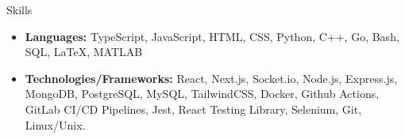\begin{cvsection}{Skills}
  \begin{cvsubsection}{}{}{}	
    \begin{itemize}
      \item \textbf{Languages:} TypeScript, JavaScript, HTML, CSS, Python, C++, Go, Bash, SQL, LaTeX, MATLAB
      \item \textbf{Technologies/Frameworks:} React, Next.js, Socket.io, Node.js, Express.js, MongoDB, PostgreSQL, MySQL, TailwindCSS, Docker, Github Actions, GitLab CI/CD Pipelines, Jest, React Testing Library, Selenium, Git, Linux/Unix.
    \end{itemize}
  \end{cvsubsection}
\end{cvsection}